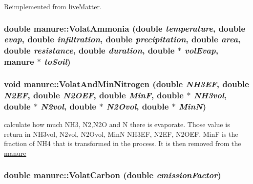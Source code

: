 Reimplemented from \hyperlink{classlive_matter_ac03a44e7ff2177c9ab7dc63876b0a6fc}{liveMatter}.\hypertarget{classmanure_ad759c54bfd7b7656f5601b39efee16a4}{
\subsubsection[{VolatAmmonia}]{\setlength{\rightskip}{0pt plus 5cm}double manure::VolatAmmonia (double {\em temperature}, \/  double {\em evap}, \/  double {\em infiltration}, \/  double {\em precipitation}, \/  double {\em area}, \/  double {\em resistance}, \/  double {\em duration}, \/  double $\ast$ {\em volEvap}, \/  {\bf manure} $\ast$ {\em toSoil})}}
\label{classmanure_ad759c54bfd7b7656f5601b39efee16a4}
\hypertarget{classmanure_abf7e3e8410ff6ec04010568c204f9ca6}{
\subsubsection[{VolatAndMinNitrogen}]{\setlength{\rightskip}{0pt plus 5cm}void manure::VolatAndMinNitrogen (double {\em NH3EF}, \/  double {\em N2EF}, \/  double {\em N2OEF}, \/  double {\em MinF}, \/  double $\ast$ {\em NH3vol}, \/  double $\ast$ {\em N2vol}, \/  double $\ast$ {\em N2Ovol}, \/  double $\ast$ {\em MinN})}}
\label{classmanure_abf7e3e8410ff6ec04010568c204f9ca6}
calculate how much NH3, N2,N2O and N there is evaporate. Those value is return in NH3vol, N2vol, N2Ovol, MinN NH3EF, N2EF, N2OEF, MinF is the fraction of NH4 that is transformed in the process. It is then removed from the \hyperlink{classmanure}{manure} \hypertarget{classmanure_ae63202774deb8721397a915d15679dba}{
\subsubsection[{VolatCarbon}]{\setlength{\rightskip}{0pt plus 5cm}double manure::VolatCarbon (double {\em emissionFactor})}}
\label{classmanure_ae63202774deb8721397a915d15679dba}
